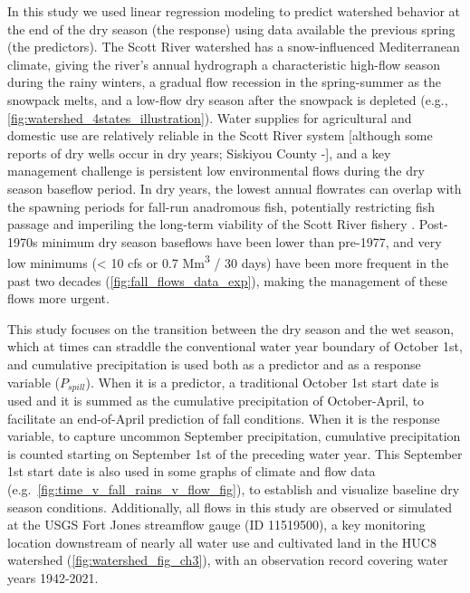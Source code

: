 \documentclass[hess, manuscript]{copernicus}
\begin{document}
In this study we used linear regression modeling to predict watershed
behavior at the end of the dry season (the response) using data
available the previous spring (the predictors). The Scott River
watershed has a snow-influenced Mediterranean climate, giving the
river's annual hydrograph a characteristic high-flow season during the
rainy winters, a gradual flow recession in the spring-summer as the
snowpack melts, and a low-flow dry season after the snowpack is depleted
(e.g., \autoref{fig:watershed_4states_illustration}). Water supplies for
agricultural and domestic use are relatively reliable in the Scott River
system {[}although some reports of dry wells occur in dry years;
Siskiyou County -\citet{SiskiyouCounty2021}{]}, and a key management
challenge is persistent low environmental flows during the dry season
baseflow period. In dry years, the lowest annual flowrates can overlap
with the spawning periods for fall-run anadromous fish, potentially
restricting fish passage and imperiling the long-term viability of the
Scott River fishery \citeyearpar[Siskiyou County][]{SiskiyouCounty2021}.
Post-1970s minimum dry season baseflows have been lower than pre-1977,
and very low minimums (\textless{} 10 cfs or 0.7 Mm\textsuperscript{3} /
30 days) have been more frequent in the past two decades
(\autoref{fig:fall_flows_data_exp}), making the management of these
flows more urgent.

This study focuses on the transition between the dry season and the wet
season, which at times can straddle the conventional water year boundary
of October 1st, and cumulative precipitation is used both as a predictor
and as a response variable (\(P_{spill}\)). When it is a predictor, a
traditional October 1st start date is used and it is summed as the
cumulative precipitation of October-April, to facilitate an end-of-April
prediction of fall conditions. When it is the response variable, to
capture uncommon September precipitation, cumulative precipitation is
counted starting on September 1st of the preceding water year. This
September 1st start date is also used in some graphs of climate and flow
data (e.g.~\autoref{fig:time_v_fall_rains_v_flow_fig}), to establish and
visualize baseline dry season conditions. Additionally, all flows in
this study are observed or simulated at the USGS Fort Jones streamflow
gauge (ID 11519500), a key monitoring location downstream of nearly all
water use and cultivated land in the HUC8 watershed
(\autoref{fig:watershed_fig_ch3}), with an observation record covering
water years 1942-2021.
\end{document}
